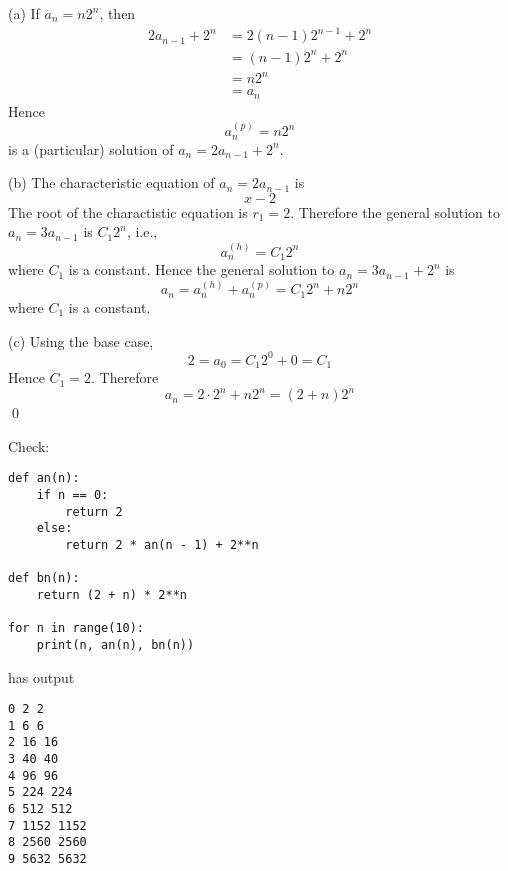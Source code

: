 
(a)
If $a_n = n 2^n$, then
\begin{align*}
  2 a_{n - 1} + 2^n
  &= 2 (n - 1) 2^{n - 1} + 2^n \\
  &= (n - 1) 2^{n} + 2^n \\
  &= n 2^{n} \\
  &= a_n
\end{align*}
Hence
\[
a_n^{(p)} = n 2^n
\]
is a (particular) solution of $a_n = 2 a_{n - 1} + 2^n$.

(b)
The characteristic equation of
$a_n = 2 a_{n - 1}$
is
\[
x - 2
\]
The root of the charactistic equation is $r_1 = 2$.
Therefore the general solution to
$a_n = 3a_{n - 1}$ is $C_1 2^n$, i.e.,
\[
a_n^{(h)} = C_1 2^n
\]
where $C_1$ is a constant.
Hence the general solution to
$a_n = 3a_{n - 1} + 2^n$ is
\[
a_n = a_n^{(h)} + a_n^{(p)} = C_1 2^n + n2^n
\]
where $C_1$ is a constant.

(c)
Using the base case,
\[
2 = a_0 = C_1 2^0 + 0 = C_1
\]
Hence $C_1 = 2$.
Therefore
\[
a_n = 2 \cdot 2^n + n2^n = (2 + n) 2^n 
\]
\qed

Check:
\begin{Verbatim}[frame=single,fontsize=\small]
def an(n):
    if n == 0:
        return 2
    else:
        return 2 * an(n - 1) + 2**n

def bn(n):
    return (2 + n) * 2**n

for n in range(10):
    print(n, an(n), bn(n))     
\end{Verbatim}
has output
\begin{Verbatim}[frame=single,fontsize=\small]
0 2 2
1 6 6
2 16 16
3 40 40
4 96 96
5 224 224
6 512 512
7 1152 1152
8 2560 2560
9 5632 5632
\end{Verbatim}
